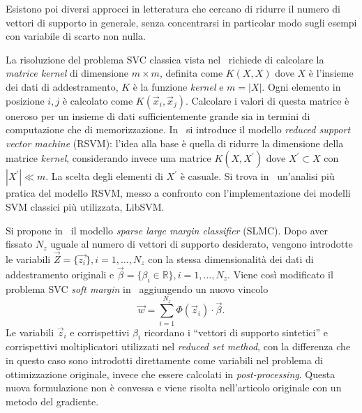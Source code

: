 Esistono poi diversi approcci in letteratura che cercano di ridurre il numero di vettori di supporto in generale, senza concentrarsi in particolar modo sugli esempi con variabile di scarto non nulla.


La risoluzione del problema SVC classica vista nel~ richiede di calcolare la \emph{matrice kernel} di dimensione $m\times m$, definita come $K(X,X)$ dove $X$ è l'insieme dei dati di addestramento, $K$ è la funzione \emph{kernel} e $m=|X|$. 
Ogni elemento in posizione $i,j$ è calcolato come $K(\Vec{x}_i, \Vec{x}_j)$. 
Calcolare i valori di questa matrice è oneroso per un insieme di dati sufficientemente grande sia in termini di computazione che di memorizzazione. 
In~\cite{2001_rsvm} si introduce il modello \emph{reduced support vector machine} (RSVM): l'idea alla base è quella di ridurre la dimensione della matrice \emph{kernel}, considerando invece una matrice $K(X,X^{'})$ dove $X^{'} \subset X$ con $|X^{'}| \ll m$. 
La scelta degli elementi di $X^{'}$ è casuale. 
Si trova in~\cite{2003_rsvm_comparison} un'analisi più pratica del modello RSVM, messo a confronto con l'implementazione dei modelli SVM classici più utilizzata, LibSVM\cite{libsvm}.

Si propone in~\cite{2005_SLMC} il modello \emph{sparse large margin classifier} (SLMC). 
Dopo aver fissato $N_z$ uguale al numero di vettori di supporto desiderato, vengono introdotte le variabili $\Vec{Z} = \{\Vec{z_i}\}, i=1,\dots,N_z$ con la stessa dimensionalità dei dati di addestramento originali e $\Vec{\beta} = \{\beta_i \in \mathbb{R}\}, i=1,\dots,N_z$.
Viene così modificato il problema SVC \emph{soft margin} in~ aggiungendo un nuovo vincolo
\begin{equation*}
    \Vec{w} = \sum_{i=1}^{N_z} \Phi(\Vec{z}_i) \cdot \Vec{\beta}.
\end{equation*}
Le variabili $\Vec{z}_i$ e corrispettivi $\beta_i$ ricordano i ``vettori di supporto sintetici'' e corrispettivi moltiplicatori utilizzati nel \emph{reduced set method}, con la differenza che in questo caso sono introdotti direttamente come variabili nel problema di ottimizzazione originale, invece che essere calcolati in \emph{post-processing}.
Questa nuova formulazione non è convessa e viene risolta nell'articolo originale con un metodo del gradiente.


